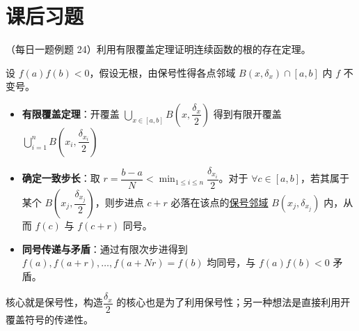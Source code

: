 \section{课后习题}

\begin{exercise}[有限覆盖定理]（每日一题例题 24）利用有限覆盖定理证明连续函数的根的存在定理。

\end{exercise}

设 $\displaystyle f(a)f(b) < 0$，假设无根，由保号性得各点邻域 $\displaystyle B(x,\delta_{x})\cap [a, b]$ 内 $\displaystyle f$ 不变号。

\begin{itemize}
  \item {\textbf{有限覆盖定理}：开覆盖 $\displaystyle \bigcup_{x \in [a,b]} B(x, \dfrac{{\delta}_x}{2})$ 得到有限开覆盖 $\displaystyle \bigcup_{i=1}^{n} B(x_{i}, \dfrac{{\delta}_{x_{i}}}{2})$}\item {\textbf{确定一致步长}：取 $\displaystyle r = \dfrac{b-a}{N} < \min_{1 \leq i \leq n} \dfrac{{\delta}_{x_i}}{2}$。对于 $\displaystyle \forall c \in [a, b]$，若其属于某个 $\displaystyle B(x_j, \dfrac{{\delta}_{x_j}}{2})$，则步进点 $\displaystyle c + r$ 必落在该点的\uline{保号邻域} $\displaystyle B(x_j, {\delta}_{x_j})$ 内，从而 $\displaystyle f(c)$ 与 $\displaystyle f(c + r)$ 同号。}\item {\textbf{同号传递与矛盾}：通过有限次步进得到 $\displaystyle f(a), f(a +r), \dots, f(a+Nr)=f(b)$ 均同号，与 $\displaystyle f(a)f(b) < 0$ 矛盾。}
\end{itemize}
核心就是保号性，构造$\displaystyle \dfrac{{\delta}_x}{2}$ 的核心也是为了利用保号性；另一种想法是直接利用开覆盖符号的传递性。
